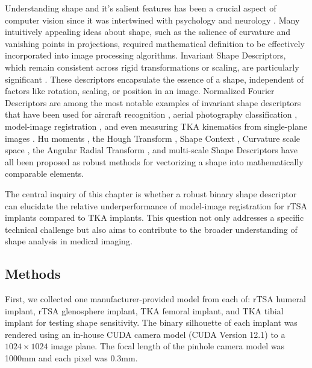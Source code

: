 Understanding shape and it's salient features has been a crucial aspect of computer vision since it was intertwined with psychology and neurology \cite{attneaveInformationalAspectsVisual1954,attneaveQuantitativeStudyShape1956}.
Many intuitively appealing ideas about shape, such as the salience of curvature and vanishing points in projections, required mathematical definition to be effectively incorporated into image processing algorithms.
Invariant Shape Descriptors, which remain consistent across rigid transformations or scaling, are particularly significant \cite{zhangReviewShapeRepresentation2004}.
These descriptors encapsulate the essence of a shape, independent of factors like rotation, scaling, or position in an image.
Normalized Fourier Descriptors are among the most notable examples of invariant shape descriptors that have been used for aircraft recognition \cite{wallaceEfficientThreedimensionalAircraft1980,wallaceAnalysisThreedimensionalMovement1980,richardIdentificationThreeDimensionalObjects1974}, aerial photography classification \cite{linClassificationPartial2D1987}, model-image registration \cite{zossoBiplanar2Dto3DRegistration2008}, and even measuring TKA kinematics from single-plane images \cite{banksAccurateMeasurementThreedimensional1996}.
Hu moments \cite{huVisualPatternRecognition1962}, the Hough Transform \cite{ballardGeneralizingHoughTransform1981}, Shape Context \cite{belongieShapeMatchingObject2002}, Curvature scale space \cite{koenderinkSurfaceShapeCurvature1992}, the Angular Radial Transform \cite{leeNewShapeDescription2012}, and multi-scale Shape Descriptors \cite{al-thelayaInShaDeInvariantShape2021} have all been proposed as robust methods for vectorizing a shape into mathematically comparable elements.

The central inquiry of this chapter is whether a robust binary shape descriptor can elucidate the relative underperformance of model-image registration for rTSA implants compared to TKA implants. This question not only addresses a specific technical challenge but also aims to contribute to the broader understanding of shape analysis in medical imaging.

\subsection{Methods}
First, we collected one manufacturer-provided model from each of: rTSA humeral implant, rTSA glenosphere implant, TKA femoral implant, and TKA tibial implant for testing shape sensitivity.
The binary silhouette of each implant was rendered using an in-house CUDA camera model (CUDA Version 12.1) \cite{nickollsScalableParallelProgramming2008} to a $1024\times 1024$ image plane.
The focal length of the pinhole camera model was 1000mm and each pixel was 0.3mm.

